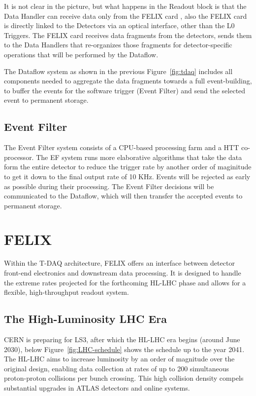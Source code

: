 It is not clear in the picture, but what happens in the Readout block is that the Data Handler can receive data only from the \acs{FELIX} card \cite{tdaq}, also the \acs{FELIX} card is directly linked to the Detectors via an optical interface, other than the \acs{L0} Triggers. The \acs{FELIX} card receives data fragments from the detectors, sends them to the Data Handlers that re-organizes those fragments for detector-specific operations that will be performed by the Dataflow.

The Dataflow system \cite{tdaq} as shown in the previous Figure~\ref{fig:tdaq} includes all components needed to aggregate the data fragments towards a full event-building, to buffer the events for the software trigger (Event Filter) and send the selected event to permanent storage.

\subsection{Event Filter}

The Event Filter system \cite{tdaq} consists of a CPU-based processing farm and a \acf{HTT} \cite{htt} co-processor. The EF system runs more elaborative algorithms that take the data form the entire detector to reduce the trigger rate by another order of maginitude to get it down to the final output rate of 10 KHz. Events will be rejected as early as possible during their processing. The Event Filter decisions will be communicated to the Dataflow, which will then transfer the accepted events to permanent storage.

\clearpage
\section{\acs{FELIX}}

Within the \acs{T-DAQ} architecture, \acs{FELIX} offers an interface between detector front-end electronics and downstream data processing. It is designed to handle the extreme rates projected for the forthcoming HL-LHC phase and allows for a flexible, high-throughput readout system.

\subsection{The High-Luminosity \acs{LHC} Era}

\ac{CERN} is preparing for \acf{LS3}, after which the \acs{HL-LHC} era begins (around June 2030), below Figure~\ref{fig:LHC-schedule} shows the schedule up to the year 2041. The \acf{HL-LHC} aims to increase luminosity by an order of magnitude over the original design, enabling data collection at rates of up to 200 simultaneous proton-proton collisions per bunch crossing. This high collision density compels substantial upgrades in \acs{ATLAS} detectors and online systems.

